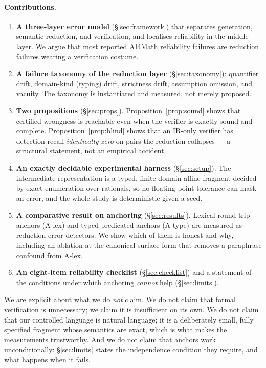 \documentclass[11pt]{article}
\newcommand{\Alex}{\textsf{A-lex}}
\newcommand{\Atype}{\textsf{A-type}}
\theoremstyle{definition}
\begin{document}
\paragraph{Contributions.}
\begin{enumerate}
  \item \textbf{A three-layer error model} (\S\ref{sec:framework}) that separates
        generation, semantic reduction, and verification, and localises
        reliability in the middle layer. We argue that most reported AI4Math
        reliability failures are reduction failures wearing a verification
        costume.
  \item \textbf{A failure taxonomy of the reduction layer}
        (\S\ref{sec:taxonomy}): quantifier drift, domain-kind (typing) drift,
        strictness drift, assumption omission, and vacuity. The taxonomy is
        instantiated and measured, not merely proposed.
  \item \textbf{Two propositions} (\S\ref{sec:props}). Proposition~\ref{prop:sound}
        shows that certified wrongness is reachable even when the verifier is
        exactly sound and complete. Proposition~\ref{prop:blind} shows that an
        IR-only verifier has detection recall \emph{identically zero} on pairs
        the reduction collapses --- a structural statement, not an empirical
        accident.
  \item \textbf{An exactly decidable experimental harness}
        (\S\ref{sec:setup}). The intermediate representation is a typed,
        finite-domain affine fragment decided by exact enumeration over rationals,
        so no floating-point tolerance can mask an error, and the whole study is
        deterministic given a seed.
  \item \textbf{A comparative result on anchoring}
        (\S\ref{sec:results}). Lexical round-trip anchors (\Alex) and typed
        predicated anchors (\Atype) are measured as reduction-error detectors.
        We show which of them is honest and why, including an ablation at the
        canonical surface form that removes a paraphrase confound from \Alex.
  \item \textbf{An eight-item reliability checklist} (\S\ref{sec:checklist}) and
        a statement of the conditions under which anchoring \emph{cannot} help
        (\S\ref{sec:limits}).
\end{enumerate}

We are explicit about what we do \emph{not} claim. We do not claim that formal
verification is unnecessary; we claim it is insufficient on its own. We do not
claim that our controlled language is natural language; it is a deliberately
small, fully specified fragment whose semantics are exact, which is what makes
the measurements trustworthy. And we do not claim that anchors work
unconditionally: \S\ref{sec:limits} states the independence condition they
require, and what happens when it fails.
\end{document}

